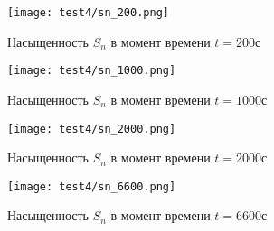 \begin{figure}
\centering
    \begin{minipage}[!ht]{0.49\textwidth}
       \texttt{[image: test4/sn\_200.png]}
       \vspace{1cm}
       \caption{Насыщенность $S_n$ в момент времени $t=200$с}
    \end{minipage}
    \hfill
    \begin{minipage}[!ht]{0.49\textwidth}
       \texttt{[image: test4/sn\_1000.png]}
       \vspace{1cm}
       \caption{Насыщенность $S_n$ в момент времени $t=1000$с}
    \end{minipage}
    \vspace{3cm}
    \vfill
    \begin{minipage}[!ht]{0.49\textwidth}
       \texttt{[image: test4/sn\_2000.png]}
       \vspace{1cm}
       \caption{Насыщенность $S_n$ в момент времени $t=2000$с}
    \end{minipage}
    \hfill
    \begin{minipage}[!ht]{0.49\textwidth}
       \texttt{[image: test4/sn\_6600.png]}
       \vspace{1cm}
       \caption{Насыщенность $S_n$ в момент времени $t=6600$с}
       \label{t4_pic_end}
    \end{minipage}
    \hfill  
\end{figure}
